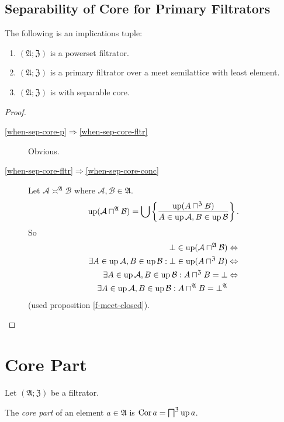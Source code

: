 \subsection{Separability of Core for Primary Filtrators}
\begin{thm}
\label{when-sep-core}The following is an implications tuple:
\begin{enumerate}
\item \label{when-sep-core-p}$(\mathfrak{A};\mathfrak{Z})$ is a powerset
filtrator.
\item \label{when-sep-core-fltr}$(\mathfrak{A};\mathfrak{Z})$ is a primary
filtrator over a meet semilattice with least element.
\item \label{when-sep-core-conc}$(\mathfrak{A};\mathfrak{Z})$ is with
separable core.
\end{enumerate}
\end{thm}
\begin{proof}
~
\begin{description}
\item [{\ref{when-sep-core-p}$\Rightarrow$\ref{when-sep-core-fltr}}] Obvious.
\item [{\ref{when-sep-core-fltr}$\Rightarrow$\ref{when-sep-core-conc}}] Let
$\mathcal{A}\asymp^{\mathfrak{A}}\mathcal{B}$ where $\mathcal{A},\mathcal{B}\in\mathfrak{A}$.
\[
\operatorname{up}(\mathcal{A}\sqcap^{\mathfrak{A}}\mathcal{B})=\bigcup\left\{ \frac{\operatorname{up}(A\sqcap^{\mathfrak{Z}}B)}{A\in\operatorname{up}\mathcal{A},B\in\operatorname{up}\mathcal{B}}\right\}.
\]
So
\begin{align*}
\bot\in\operatorname{up}(\mathcal{A}\sqcap^{\mathfrak{A}}\mathcal{B}) & \Leftrightarrow\\
\exists A\in\operatorname{up}\mathcal{A},B\in\operatorname{up}\mathcal{B}:\bot\in\operatorname{up}(A\sqcap^{\mathfrak{Z}}B) & \Leftrightarrow\\
\exists A\in\operatorname{up}\mathcal{A},B\in\operatorname{up}\mathcal{B}:A\sqcap^{\mathfrak{Z}}B=\bot & \Leftrightarrow\\
\exists A\in\operatorname{up}\mathcal{A},B\in\operatorname{up}\mathcal{B}:A\sqcap^{\mathfrak{A}}B=\bot^{\mathfrak{A}}
\end{align*}
(used proposition \ref{f-meet-closed}).
\end{description}
\end{proof}

\section{Core Part}
Let $(\mathfrak{A};\mathfrak{Z})$ be a filtrator.
\begin{defn}
The \emph{core part} of an element $a\in\mathfrak{A}$
is $\operatorname{Cor} a=\bigsqcap^{\mathfrak{Z}}\operatorname{up} a$.
\end{defn}

